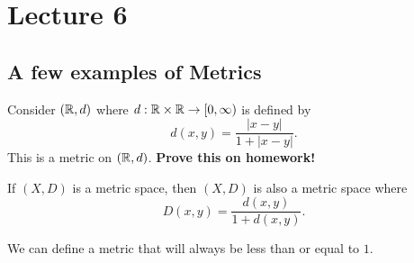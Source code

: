 \documentclass[a4paper]{report}
\begin{document}
\section{Lecture 6}

\subsection{A few examples of Metrics}

\begin{eg}
    Consider \( (\mathbb{R}, d) \) where \( d: \mathbb{R} \times \mathbb{R} \to [0,\infty )  \) is defined by   
    \[  d(x,y) = \frac{ | x - y |  }{ 1 + | x - y |  }.  \]
    This is a metric on \( (\mathbb{R}, d) \). \textbf{Prove this on homework!}
\end{eg}

\begin{remark}
    If \( (X,D) \) is a metric space, then \( (X,D)  \) is also a metric space where
    \[  D(x,y) = \frac{ d(x,y) }{ 1 + d(x,y) }. \]
\end{remark}

We can define a metric that will always be less than or equal to \( 1 \).
\end{document}
